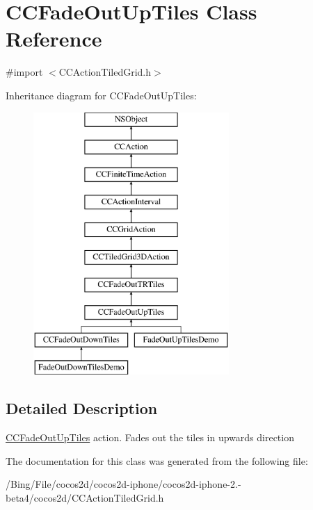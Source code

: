 \hypertarget{interface_c_c_fade_out_up_tiles}{\section{C\-C\-Fade\-Out\-Up\-Tiles Class Reference}
\label{interface_c_c_fade_out_up_tiles}
}


{\ttfamily \#import $<$C\-C\-Action\-Tiled\-Grid.\-h$>$}

Inheritance diagram for C\-C\-Fade\-Out\-Up\-Tiles\-:\begin{figure}[H]
\begin{center}
\leavevmode
\includegraphics[height=10.000000cm]{interface_c_c_fade_out_up_tiles}
\end{center}
\end{figure}


\subsection{Detailed Description}
\hyperlink{interface_c_c_fade_out_up_tiles}{C\-C\-Fade\-Out\-Up\-Tiles} action. Fades out the tiles in upwards direction 

The documentation for this class was generated from the following file\-:\begin{DoxyCompactItemize}
\item 
/\-Bing/\-File/cocos2d/cocos2d-\/iphone/cocos2d-\/iphone-\/2.-\/beta4/cocos2d/C\-C\-Action\-Tiled\-Grid.\-h\end{DoxyCompactItemize}

